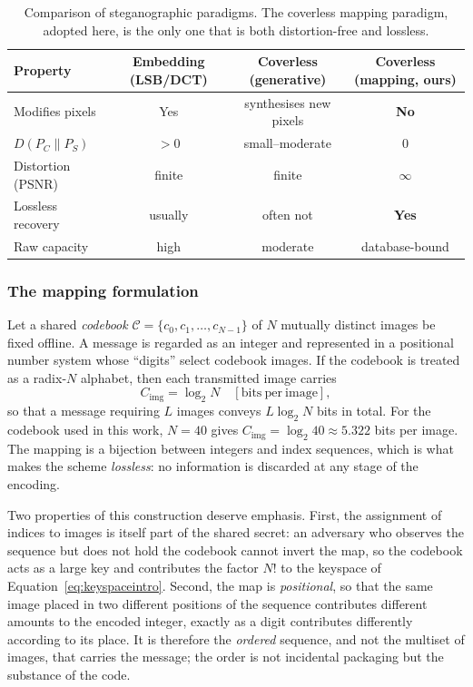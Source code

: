 \documentclass[10pt,a4paper]{article}
\theoremstyle{definition}
\begin{document}
\begin{table}[t]
\centering
\caption{Comparison of steganographic paradigms. The coverless mapping paradigm,
adopted here, is the only one that is both distortion-free and lossless.}\label{tab:paradigms}
\begin{tabular}{@{}lccc@{}}
\toprule
Property & Embedding (LSB/DCT) & Coverless (generative) & Coverless (mapping, ours) \\
\midrule
Modifies pixels        & Yes & synthesises new pixels & \textbf{No} \\
$D(P_C\|P_S)$          & $>0$ & small--moderate & \textbf{$0$} \\
Distortion (PSNR)      & finite & finite & \textbf{$\infty$} \\
Lossless recovery      & usually & often not & \textbf{Yes} \\
Raw capacity           & high & moderate & database-bound \\
\bottomrule
\end{tabular}
\end{table}

\subsubsection{The mapping formulation}\label{sec:mapping}
Let a shared \emph{codebook} $\mathcal{C}=\{c_0,c_1,\dots,c_{N-1}\}$ of $N$
mutually distinct images be fixed offline. A message is regarded as an integer and
represented in a positional number system whose ``digits'' select codebook images.
If the codebook is treated as a radix-$N$ alphabet, then each transmitted image
carries
\begin{equation}
  C_{\text{img}} = \log_2 N \quad[\mathrm{bits\ per\ image}],
  \label{eq:capimg}
\end{equation}
so that a message requiring $L$ images conveys $L\log_2 N$ bits in total. For the
codebook used in this work, $N=40$ gives $C_{\text{img}}=\log_2 40\approx 5.322$
bits per image. The mapping is a bijection between integers and index sequences,
which is what makes the scheme \emph{lossless}: no information is discarded at any
stage of the encoding.

Two properties of this construction deserve emphasis. First, the assignment of
indices to images is itself part of the shared secret: an adversary who observes the
sequence but does not hold the codebook cannot invert the map, so the codebook acts
as a large key and contributes the factor $N!$ to the keyspace of
Equation~\eqref{eq:keyspaceintro}. Second, the map is \emph{positional}, so that the same image
placed in two different positions of the sequence contributes different amounts to
the encoded integer, exactly as a digit contributes differently according to its
place. It is therefore the \emph{ordered} sequence, and not the multiset of images,
that carries the message; the order is not incidental packaging but the substance of
the code.
\end{document}
